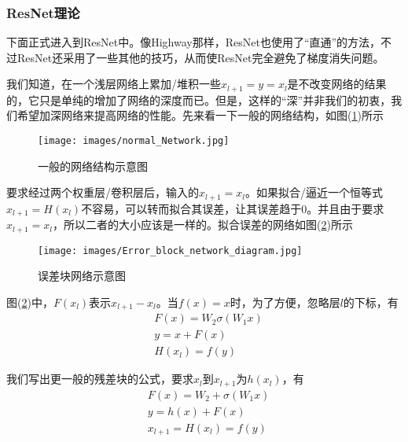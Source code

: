         \subsubsection{ResNet理论}
            \par
            下面正式进入到ResNet中。像Highway那样，ResNet也使用了“直通”的方法，不过ResNet还采用了一些其他的技巧，从而使ResNet完全避免了梯度消失问题。
            \par
            我们知道，在一个浅层网络上累加/堆积一些$x_{l+1} = y = x_l$是不改变网络的结果的，它只是单纯的增加了网络的深度而已。但是，这样的“深”并非我们的初衷，我们希望加深网络来提高网络的性能。先来看一下一般的网络结构，如图(\ref{fig:一般的网络结构示意图})所示
             \begin{figure}[H]
            \centering
            \texttt{[image: images/normal\_Network.jpg]}
            \caption{一般的网络结构示意图}
            \label{fig:一般的网络结构示意图}
            \end{figure}
            要求经过两个权重层/卷积层后，输入的$x_{l+1} = x_l$。如果拟合/逼近一个恒等式$x_{l+1} = H(x_l)$不容易，可以转而拟合其误差，让其误差趋于0。并且由于要求$x_{l+1} = x_l$，所以二者的大小应该是一样的。拟合误差的网络如图(\ref{fig:误差块网络示意图})所示
             \begin{figure}[H]
            \centering
            \texttt{[image: images/Error\_block\_network\_diagram.jpg]}
            \caption{误差块网络示意图}
            \label{fig:误差块网络示意图}
            \end{figure}
            图(\ref{fig:误差块网络示意图})中，$F(x_l)$表示$x_{l+1}-x_l$。当$f(x) = x$时，为了方便，忽略层$l$的下标，有
            \begin{align*}
            & F(x) = W_2\sigma (W_1x)\\
            & y = x+F(x)\\
            & H(x_l) = f(y)
            \end{align*}
            \par
            我们写出更一般的残差块的公式，要求$x_l$到$x_{l+1}$为$h(x_l)$，有
            \begin{align*}
            & F(x) = W_2+\sigma(W_1x)\\
            & y = h(x)+F(x)\\
            & x_{l+1} = H(x_l) = f(y)
            \end{align*}
